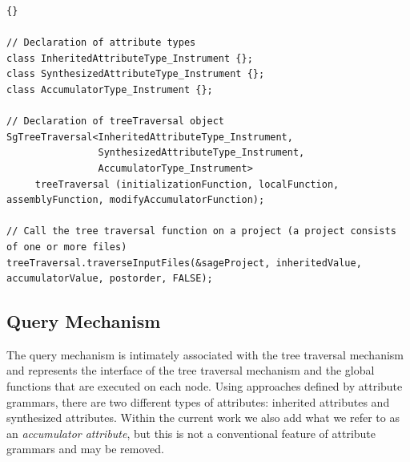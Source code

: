 \documentclass[10pt]{article}
\begin{document}
\begin{lstlisting}{}

// Declaration of attribute types
class InheritedAttributeType_Instrument {};
class SynthesizedAttributeType_Instrument {};
class AccumulatorType_Instrument {};

// Declaration of treeTraversal object
SgTreeTraversal<InheritedAttributeType_Instrument, 
                SynthesizedAttributeType_Instrument,
                AccumulatorType_Instrument>
     treeTraversal (initializationFunction, localFunction, assemblyFunction, modifyAccumulatorFunction);

// Call the tree traversal function on a project (a project consists of one or more files)
treeTraversal.traverseInputFiles(&sageProject, inheritedValue, accumulatorValue, postorder, FALSE);

\end{lstlisting}


\subsection{Query Mechanism}

    The query mechanism is intimately associated with the tree traversal mechanism and represents
the interface of the tree traversal mechanism and the global functions that are executed on each
node.  Using approaches defined by attribute grammars, there are two different types of attributes:
inherited attributes and synthesized attributes.   Within the current work we also add 
what we refer to as an {\em accumulator attribute}, but this is not a conventional feature of
attribute grammars and may be removed.
\end{document}

